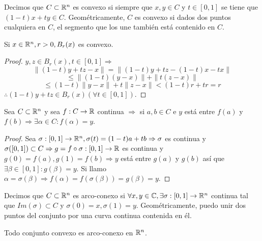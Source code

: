 \begin{definition}[Convexidad]
  Decimos que $C \subset \mathbb{R}^n$ es convexo si siempre que $x, y \in C$ y $t \in [0, 1]$ se tiene que $(1-t)x+ty \in C$. Geométricamente, $C$ es convexo si dados dos puntos cualquiera en $C$, el segmento que los une también está contenido en $C$.
\end{definition}

\begin{eg}
  Si $x \in \mathbb{R}^n, r > 0, B_r(x)$ es convexo.
  \begin{proof}
    $y, z \in B_r(x), t \in [0,1] \Rightarrow$ \begin{equation} \|(1-t)y+tz - x\| = \| (1-t)y + tz - (1-t)x - tx \| \end{equation} \begin{equation} \leq \|(1 -t) (y-x) \| + \|t(z-x)\| \end{equation}
    \begin{equation} \leq (1-t) \|y-x\| + t \|z-x\| < (1-t)r + tr = r \end{equation} $\therefore (1-t)y + tz \in B_r(x) (\forall t \in [0, 1])$.
  \end{proof}
\end{eg}

\begin{prop}
  Sea $C \subset \mathbb{R}^n$ y sea $f : C \to \mathbb{R}$ continua $\Rightarrow$ si $a, b \in C$ e $y$ está entre $f(a)$ y $f(b) \Rightarrow \exists \alpha \in C : f(\alpha) = y$.
  \begin{proof}
    Sea $\sigma: [0, 1] \to \mathbb{R}^n, \sigma(t) = (1-t)a+tb \Rightarrow \sigma$ es continua y $\sigma([0, 1]) \subset C \Rightarrow g = f \circ \sigma: [0, 1] \to \mathbb{R}$ es continua y $g(0) = f(a), g(1) = f(b) \Rightarrow y$ está entre $g(a)$ y $g(b)$ así que $\exists \beta \in [0, 1] : g(\beta) = y$. Si llamo $\alpha = \sigma(\beta) \Rightarrow f(\alpha) = f(\sigma(\beta)) = g(\beta) = y$.
  \end{proof}
\end{prop}

\begin{definition}
  Decimos que $C \subset \mathbb{R}^n$ es arco-conexo si $\forall x, y \in \mathbb{C}, \exists \sigma: [0, 1] \to \mathbb{R}^n$ continua tal que $Im(\sigma) \subset C$ y $\sigma(0) = x, \sigma(1) = y$. Geométricamente, puedo unir dos puntos del conjunto por una curva continua contenida en él.
\end{definition}

\begin{note}
  Todo conjunto convexo es arco-conexo en $\mathbb{R}^n$.
\end{note}

